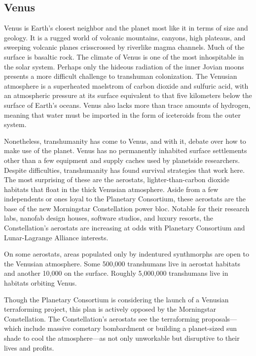 \subsection{Venus} \label{sec:venus} 

Venus is Earth's closest neighbor and the planet most like it in terms of size and geology. It is a rugged world of volcanic mountains, canyons, high plateaus, and sweeping volcanic planes crisscrossed by riverlike magma channels. Much of the surface is basaltic rock. The climate of Venus is one of the most inhospitable in the solar system. Perhaps only the hideous radiation of the inner Jovian moons presents a more difficult challenge to transhuman colonization. The Venusian atmosphere is a superheated maelstrom of carbon dioxide and sulfuric acid, with an atmospheric pressure at its surface equivalent to that five kilometers below the surface of Earth's oceans. Venus also lacks more than trace amounts of hydrogen, meaning that water must be imported in the form of iceteroids from the outer system. 

Nonetheless, transhumanity has come to Venus, and with it, debate over how to make use of the planet. Venus has no permanently inhabited surface settlements other than a few equipment and supply caches used by planetside researchers. Despite difficulties, transhumanity has found survival strategies that work here. The most surprising of these are the aerostats, lighter-than-carbon dioxide habitats that float in the thick Venusian atmosphere. Aside from a few independents or ones loyal to the Planetary Consortium, these aerostats are the base of the new Morningstar Constellation power bloc. Notable for their research labs, nanofab design houses, software studios, and luxury resorts, the Constellation's aerostats are increasing at odds with Planetary Consortium and Lunar-Lagrange Alliance interests. 

On some aerostats, areas populated only by indentured synthmorphs are open to the Venusian atmosphere. Some 500,000 transhumans live in aerostat habitats and another 10,000 on the surface. Roughly 5,000,000 transhumans live in habitats orbiting Venus. 

Though the Planetary Consortium is considering the launch of a Venusian terraforming project, this plan is actively opposed by the Morningstar Constellation. The Constellation's aerostats see the terraforming proposals—which include massive cometary bombardment or building a planet-sized sun shade to cool the atmosphere—as not only unworkable but disruptive to their lives and profits. 

